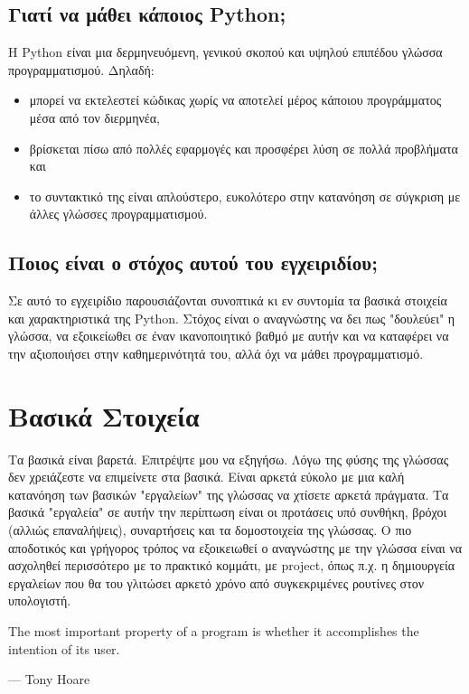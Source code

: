 \documentclass[14pt]{extreport}
\begin{document}
\section{Γιατί να μάθει κάποιος Python;}

Η Python είναι μια δερμηνευόμενη, γενικού σκοπού και υψηλού επιπέδου γλώσσα
προγραμματισμού. Δηλαδή:
\begin{itemize}
    \itemsep0cm
    \item μπορεί να εκτελεστεί κώδικας χωρίς να αποτελεί μέρος κάποιου προγράμματος μέσα από τον διερμηνέα,
    \item βρίσκεται πίσω από πολλές εφαρμογές και προσφέρει λύση σε πολλά
          προβλήματα και
    \item το συντακτικό της είναι απλούστερο, ευκολότερο στην κατανόηση σε
          σύγκριση με άλλες γλώσσες προγραμματισμού.
\end{itemize}

\section{Ποιος είναι ο στόχος αυτού του εγχειριδίου;}

Σε αυτό το εγχειρίδιο παρουσιάζονται συνοπτικά κι εν συντομία τα βασικά στοιχεία και χαρακτηριστικά της Python. Στόχος είναι ο αναγνώστης να δει πως "δουλεύει" η γλώσσα, να εξοικείωθει σε έναν ικανοποιητικό βαθμό με αυτήν και να καταφέρει να την αξιοποιήσει στην καθημερινότητά του, αλλά όχι να μάθει προγραμματισμό.


\chapter{Βασικά Στοιχεία}

Τα βασικά είναι βαρετά. Επιτρέψτε μου να εξηγήσω. Λόγω της φύσης της γλώσσας δεν χρειάζεστε να επιμείνετε στα βασικά. Είναι αρκετά εύκολο με μια καλή κατανόηση των βασικών "εργαλείων" της γλώσσας να χτίσετε αρκετά πράγματα. Τα βασικά "εργαλεία" σε αυτήν την περίπτωση είναι οι προτάσεις υπό συνθήκη, βρόχοι (αλλιώς επαναλήψεις), συναρτήσεις και τα δομοστοιχεία της γλώσσας. Ο πιο αποδοτικός και γρήγορος τρόπος να εξοικειωθεί ο αναγνώστης με την γλώσσα είναι να ασχοληθεί περισσότερο με το πρακτικό κομμάτι, με project, όπως π.χ. η δημιουργεία εργαλείων που θα του γλιτώσει αρκετό χρόνο από συγκεκριμένες ρουτίνες στον υπολογιστή.

\epigraph{The most important property of a program is whether it accomplishes the intention of its user.}{--- Tony Hoare}
\end{document}
